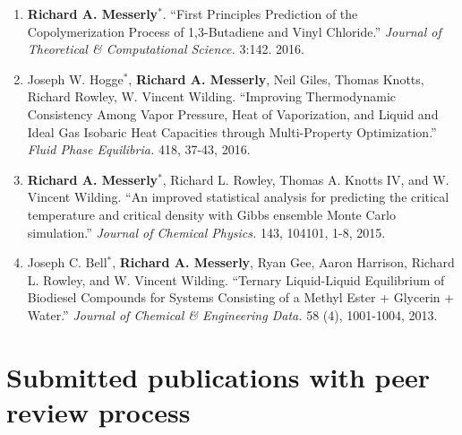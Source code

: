 \documentclass[12pt]{article}
\begin{document}
\begin{enumerate}
\item \textbf{Richard A. Messerly}$^*$. ``First Principles Prediction of the Copolymerization Process of 1,3-Butadiene and Vinyl Chloride.'' \textit{Journal of Theoretical \& Computational Science.} 3:142. 2016.

\item Joseph W. Hogge$^*$, \textbf{Richard A. Messerly}, Neil Giles, Thomas Knotts, Richard Rowley, W. Vincent Wilding. ``Improving Thermodynamic Consistency Among Vapor Pressure, Heat of Vaporization, and Liquid and Ideal Gas Isobaric Heat Capacities through Multi{-}Property Optimization.'' \textit{Fluid Phase Equilibria.} 418, 37-43, 2016.

\item \textbf{Richard A. Messerly}$^*$, Richard L. Rowley, Thomas A. Knotts IV, and W. Vincent Wilding. ``An improved statistical analysis for predicting the critical temperature and critical density with Gibbs ensemble Monte Carlo simulation.'' \textit{Journal of Chemical Physics.} 143, 104101, 1-8, 2015.

\item Joseph C. Bell$^*$, \textbf{Richard A. Messerly}, Ryan Gee, Aaron Harrison, Richard L. Rowley, and W. Vincent Wilding. ``Ternary Liquid{-}Liquid Equilibrium of Biodiesel Compounds for Systems Consisting of a Methyl Ester + Glycerin + Water.'' \textit{Journal of Chemical \& Engineering Data.} 58 (4), 1001-1004, 2013.

\end{enumerate}

\section{Submitted publications with peer review process}
\end{document}
